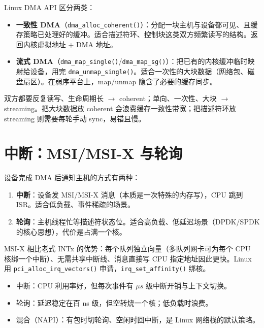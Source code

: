 \documentclass[12pt,a4paper,fontset=fandol]{ctexbook}
\newcommand{\Fn}[1]{\texttt{#1()}}
\begin{document}
Linux DMA API 区分两类：

\begin{itemize}[nosep]
  \item \textbf{一致性 DMA}（\Fn{dma\_alloc\_coherent}）：分配一块主机与设备都可见、且缓存策略已处理好的缓冲。适合描述符环、控制块这类双方频繁读写的结构。返回内核虚拟地址 + DMA 地址。
  \item \textbf{流式 DMA}（\Fn{dma\_map\_single}/\allowbreak{}\Fn{dma\_map\_sg}）：把已有的内核缓冲临时映射给设备，用完 \Fn{dma\_unmap\_single}。适合一次性的大块数据（网络包、磁盘扇区）。在弱序平台上，map/unmap 隐含了必要的缓存同步。
\end{itemize}

\begin{tcolorbox}[guideline={选型的经验法则}]
双方都要反复读写、生命周期长 $\rightarrow$ coherent；单向、一次性、大块 $\rightarrow$ streaming。把大块数据放 coherent 会浪费缓存一致性带宽；把描述符环放 streaming 则需要每轮手动 sync，易错且慢。
\end{tcolorbox}

\section{中断：MSI/MSI-X 与轮询}\label{sec:msix}

设备完成 DMA 后通知主机的方式有两种：

\begin{enumerate}[nosep]
  \item \textbf{中断}：设备发 MSI/MSI-X 消息（本质是一次特殊的内存写），CPU 跳到 ISR。适合低负载、事件稀疏的场景。
  \item \textbf{轮询}：主机线程忙等描述符状态位。适合高负载、低延迟场景（DPDK/SPDK 的核心思想），代价是占满一个核。
\end{enumerate}

MSI-X 相比老式 INTx 的优势：每个队列独立向量（多队列网卡可为每个 CPU 核绑一个中断）、无需共享中断线、消息直接写 CPU 指定地址因此更快。Linux 用 \Fn{pci\_alloc\_irq\_vectors} 申请，\Fn{irq\_set\_affinity} 绑核。

\begin{tcolorbox}[compare={中断 vs 轮询}]
\begin{itemize}[nosep]
  \item 中断：CPU 利用率好，但每次事件有 $\mu s$ 级中断开销与上下文切换。
  \item 轮询：延迟稳定在百 ns 级，但空转烧一个核；低负载时浪费。
  \item 混合（NAPI）：有包时切轮询、空闲时回中断，是 Linux 网络栈的默认策略。
\end{itemize}
\end{tcolorbox}
\end{document}

